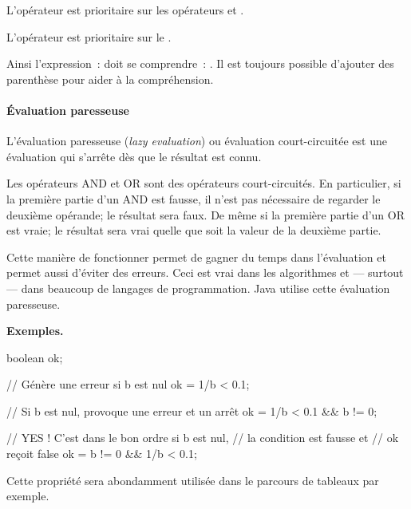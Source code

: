 				L'opérateur  est prioritaire sur les opérateurs 
				et .

				L'opérateur  est prioritaire sur le .
				
				Ainsi l’expression~: 
				doit se comprendre~: .
				Il est toujours possible d'ajouter des parenthèse pour aider 
				à la compréhension. 

				\paragraph{Évaluation paresseuse} 
				\label{court-circuit}
			
				L'évaluation paresseuse (\textit{lazy evaluation}) ou évaluation
				court-circuitée est une évaluation qui s'arrête dès que le 
				résultat est connu. 
			
				Les opérateurs AND et OR sont des opérateurs court-circuités.
				En particulier, si la première partie d’un AND est fausse, il
				n'est pas nécessaire de regarder le deuxième opérande; le
				résultat sera faux. De même si la première partie d'un OR est
				vraie; le résultat sera vrai quelle que soit la valeur de la
				deuxième partie. 

				Cette manière de fonctionner permet de gagner du temps dans
				l'évaluation et permet aussi d'éviter des erreurs. Ceci est vrai
				dans les algorithmes et — surtout — dans beaucoup de langages 
				de programmation. Java utilise cette évaluation paresseuse.  
				 
				\textbf{Exemples.}

				\begin{java}
boolean ok;

// Génère une erreur si b est nul
ok = 1/b < 0.1;

// Si b est nul, provoque une erreur et un arrêt
ok = 1/b < 0.1 && b != 0;

// YES ! C'est dans le bon ordre si b est nul, 
// la condition est fausse et
// ok reçoit false
ok = b != 0 && 1/b < 0.1;
				\end{java}

				Cette propriété sera abondamment utilisée dans le parcours
				de tableaux par exemple. 


